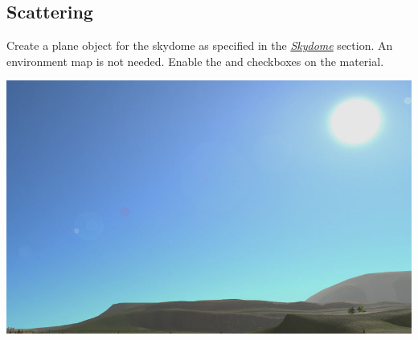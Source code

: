\documentclass[a4paper,12pt,oneside]{sphinxmanual}
\begin{document}
\subsection{Scattering}
\label{outdoor_rendering:id26}
Create a plane object for the skydome as specified in the {\hyperref[textures:skydome-texture]{\emph{Skydome}}} section. An environment map is not needed. Enable the  and  checkboxes on the material.

{\hfill\includegraphics[width=1.000\linewidth]{skydome_procedural.jpg}\hfill}

\begin{DUlineblock}{0em}
\item[] 
\end{DUlineblock}
\end{document}
